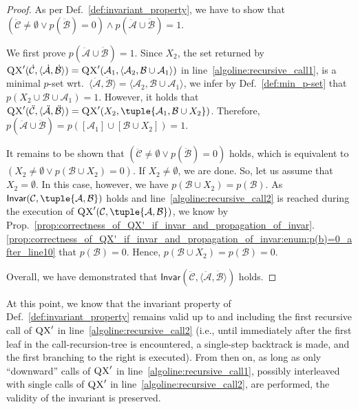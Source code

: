 \documentclass[]{elsarticle}
\newcommand{\scQX}{{\textsc{QX}}}
\newcommand{\ma}{\mathcal{A}}
\newcommand{\mb}{\mathcal{B}}
\newcommand{\mc}{\mathcal{C}}
\newcommand{\Inv}{\mathsf{Invar}}
\newcommand{\ddmb}{\ddot{\mb}}
\newcommand{\ddma}{\ddot{\ma}}
\newcommand{\ddmc}{\ddot{\mc}}
\newcommand{\dmb}{\dot{\mb}}
\newcommand{\dma}{\dot{\ma}}
\newcommand{\dmc}{\dot{\mc}}
\begin{document}
	\begin{proof}
		As per Def.~\ref{def:invariant_property}, we have to show that $(\ddmc \neq \emptyset \lor p(\ddmb)=0) \land p(\ddma \cup \ddmb) = 1$.\vspace{5pt} 
		
		\noindent We first prove $p(\ddma \cup \ddmb) = 1$. Since $X_2$, the set returned by $\scQX'(\dmc,\langle\dma,\dmb\rangle) = \scQX'(\ma_1,\langle\ma_2,\mb\cup\ma_1\rangle)$ in line~\ref{algoline:recursive_call1}, is a minimal $p$-set wrt.\ $\langle\dma,\dmb\rangle = \langle\ma_2,\mb\cup\ma_1\rangle$, we infer by Def.~\ref{def:min_p-set} that $p(X_2 \cup \mb \cup \ma_1) = 1$. However, it holds that $\scQX'(\ddmc,\langle\ddma,\ddmb\rangle)=\scQX'(X_2,\tuple{\ma_1,\mb\cup X_2})$. Therefore, $p(\ddma\cup\ddmb) = p([\ma_1]\cup[\mb\cup X_2]) = 1$.\vspace{5pt}
		
		\noindent It remains to be shown that $(\ddmc \neq \emptyset \lor p(\ddmb)=0)$ holds, which is equivalent to $(X_2 \neq \emptyset \lor p(\mb \cup X_2)=0)$. If $X_2 \neq \emptyset$, we are done. So, let us assume that $X_2 = \emptyset$. In this case, however, we have $p(\mb \cup X_2)=p(\mb)$. As $\Inv(\mc,\tuple{\ma,\mb})$ holds and line~\ref{algoline:recursive_call2} is reached during the execution of $\scQX'(\mc,\tuple{\ma,\mb})$, we know by Prop.~\ref{prop:correctness_of_QX'_if_invar_and_propagation_of_invar}.\ref{prop:correctness_of_QX'_if_invar_and_propagation_of_invar:enum:p(b)=0_after_line10} that $p(\mb)=0$. Hence, 
		$p(\mb \cup X_2) = p(\mb) = 0$.\vspace{5pt}
		
		\noindent Overall, we have demonstrated that $\Inv(\ddmc,\langle\ddma,\ddmb\rangle)$ holds.
	\end{proof}
	\noindent At this point, we know that the invariant property of Def.~\ref{def:invariant_property} remains valid up to and including the first recursive call of $\scQX'$ in line~\ref{algoline:recursive_call2} (i.e., until immediately after the first leaf in the call-recursion-tree is encountered, a single-step backtrack is made, and the first branching to the right is executed). From then on, as long as only ``downward'' calls of $\scQX'$ in line~\ref{algoline:recursive_call1}, possibly interleaved with single calls of $\scQX'$ in line~\ref{algoline:recursive_call2}, are performed, the validity of the invariant is preserved. 
	
\end{document}
